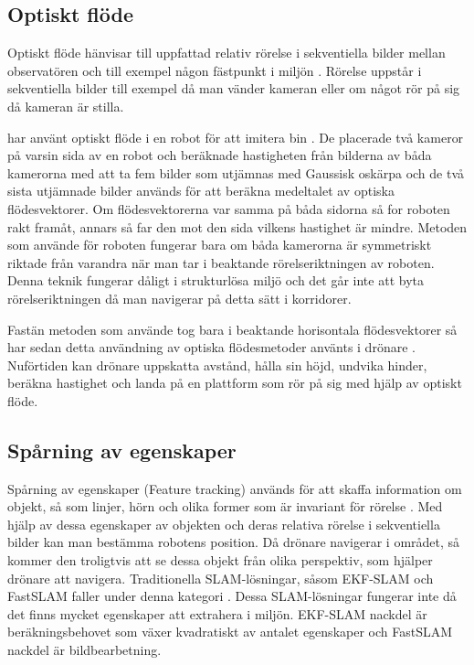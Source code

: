 \subsection{Optiskt flöde}

Optiskt flöde hänvisar till uppfattad relativ rörelse i sekventiella bilder mellan observatören och till exempel någon fästpunkt i miljön \citep{opticalflowuav}. Rörelse uppstår i sekventiella bilder till exempel då man vänder kameran eller om något rör på sig då kameran är stilla. 

\cite{341094} har använt optiskt flöde i en robot för att imitera bin \citep{341094}. De placerade två kameror på varsin sida av en robot och beräknade hastigheten från bilderna av båda kamerorna med att ta fem bilder som utjämnas med Gaussisk oskärpa och de två sista utjämnade bilder används för att beräkna medeltalet av optiska flödesvektorer. Om flödesvektorerna var samma på båda sidorna så for roboten rakt framåt, annars så far den mot den sida vilkens hastighet är mindre. Metoden som \cite{341094} använde för roboten fungerar bara om båda kamerorna är symmetriskt riktade från varandra när man tar i beaktande rörelseriktningen av roboten. Denna teknik fungerar dåligt i strukturlösa miljö och det går inte att byta rörelseriktningen då man navigerar på detta sätt i korridorer. 

Fastän metoden som \cite{341094} använde tog bara i beaktande horisontala flödesvektorer så har sedan detta användning av optiska flödesmetoder använts i drönare \citep{6564752}. Nuförtiden kan drönare uppskatta avstånd, hålla sin höjd, undvika hinder, beräkna hastighet och landa på en plattform som rör på sig med hjälp av optiskt flöde.

\subsection{Spårning av egenskaper}

Spårning av egenskaper (Feature tracking) används för att skaffa information om objekt, så som linjer, hörn och olika former som är invariant för rörelse \citep{geospatial}. Med hjälp av dessa egenskaper av objekten och deras relativa rörelse i sekventiella bilder kan man bestämma robotens position. Då drönare navigerar i området, så kommer den troligtvis att se dessa objekt från olika perspektiv, som hjälper drönare att navigera. Traditionella SLAM-lösningar, såsom EKF-SLAM och FastSLAM faller under denna kategori \citep{voslamlatif}. Dessa SLAM-lösningar fungerar inte då det finns mycket egenskaper att extrahera i miljön. EKF-SLAM nackdel är beräkningsbehovet som växer kvadratiskt av antalet egenskaper och FastSLAM nackdel är bildbearbetning.

